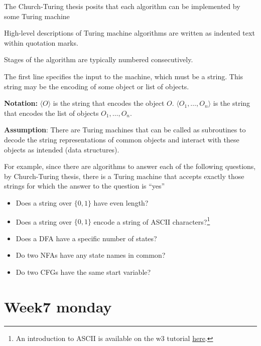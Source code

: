 \documentclass[12pt, oneside]{article}
\begin{document}
The Church-Turing thesis posits that each algorithm can be implemented by some Turing machine

High-level descriptions of  Turing machine algorithms are written as indented text within quotation marks.   

Stages of the algorithm are typically numbered consecutively.

The first line specifies the input to the machine, which must be a string.
This string may be the encoding of some object or  list of  objects.  

{\bf Notation:} $\langle O \rangle$ is the string that encodes the object $O$.
$\langle O_1, \ldots, O_n \rangle$ is the string that encodes the list of objects $O_1, \ldots, O_n$.

{\bf Assumption}: There are Turing  machines that can be called as subroutines
to decode the string representations of common objects and  interact with these objects as intended
(data structures).
  
For example, since there are algorithms to answer each of the following questions,
by Church-Turing thesis, there is a Turing machine that accepts exactly those strings for which the 
answer to the question is ``yes''
\begin{itemize}
    \item Does a string over $\{0,1\}$ have even length?

    \vfill

    \item Does a string over $\{0,1\}$ encode a string of ASCII characters?\footnote{An introduction to ASCII 
    is available on the w3 tutorial \href{https://www.w3schools.com/charsets/ref_html_ascii.asp}{here}.}

    \vfill

    \item Does a DFA have a specific number of states?

    \vfill

    \item Do two NFAs have any state names in common?

    \vfill

    \item Do two CFGs have the same start variable?

    \vfill

  \end{itemize}
 \vfill
\section*{Week7 monday}
\end{document}
